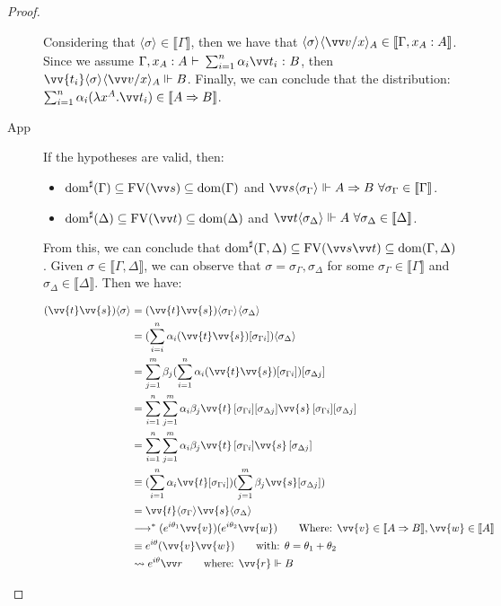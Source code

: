 \documentclass[runningheads,orivec,envcountsame,envcountsect]{llncs}
\newcommand\lra{\longrightarrow}
\newcommand\ansubst[2]{\ensuremath{\langle #1 \rangle_{#2}}}
\newcommand\dom[1]{\mathrm{dom}(#1)}
\newcommand\sdom[1]{\mathrm{dom}^{\sharp}(#1)}
\newcommand\FV[1]{\mathrm{FV}(#1)}
\def\Lam#1#2#3{\lambda#1^{#2}{.}#3} %
\def\lraneq{\rightsquigarrow}
\def\eval{\lra^*}
\def\Arr{\Rightarrow}
\def\sem#1{\llbracket#1\rrbracket}
\def\TYP#1#2#3{#1~{\vdash}~#2~{:}~#3}
\def\real{\Vdash}
\begin{document}
\begin{proof}
\begin{description}
    Considering that $\ansubst{\sigma}{}\in\sem{\Gamma}$, then we have that $\ansubst{\sigma}{}\ansubst{\vv v/x}{A}\in\sem{\Gamma,x_A:A}$. Since we assume $\TYP{\Gamma, x_A:A}{\sum_{i=1}^{n}\alpha_i\vv t_i}{B}$, then $\vv{t_i}\ansubst{\sigma}{}\ansubst{\vv v/x}{A}\real B$. Finally, we can conclude that the distribution: $\sum_{i=1}^{n}\alpha_i (\Lam{x}{A}{\vv t_i})\in\sem{A\Arr B}$.

    \item[App] If the hypotheses are valid, then:
    \begin{itemize}
        \item $\sdom{\Gamma}\subseteq \FV{\vv s}\subseteq \dom{\Gamma}$ and $\vv s \ansubst{\sigma_\Gamma}{}\Vdash A\Arr B\ \forall \sigma_\Gamma\in\sem{\Gamma}$.
        \item $\sdom{\Delta}\subseteq \FV{\vv t}\subseteq \dom{\Delta}$ and $\vv t\ansubst{\sigma_\Delta}{}\Vdash A\ \forall\sigma_\Delta\in\sem{\Delta}$.
    \end{itemize}
    
    From this, we can conclude that $\sdom{\Gamma,\Delta}\subseteq \FV{\vv s \vv t}\subseteq \dom{\Gamma,\Delta}$. Given $\sigma\in\sem{\Gamma,\Delta}$, we can observe that $\sigma=\sigma_\Gamma,\sigma_\Delta$ for some $\sigma_\Gamma\in\sem{\Gamma}$ and $\sigma_\Delta\in\sem{\Delta}$. Then we have:
    
    \begin{align*}
        (\vv{t}\vv{s})\ansubst{\sigma}{} &= (\vv{t}\vv{s})\ansubst{\sigma_\Gamma}{}\ansubst{\sigma_\Delta}{}\\
        &=(\sum_{i=i}^{n}\alpha_i (\vv{t}\vv{s})[\sigma_{\Gamma i}])\ansubst{\sigma_\Delta}{}\\
        &=\sum_{j=1}^{m} \beta_j (\sum_{i=1}^{n} \alpha_i (\vv{t} \vv{s})[\sigma_{\Gamma i}])[\sigma_{\Delta j}]\\
        &=\sum_{i=1}^{n}\sum_{j=1}^{m} \alpha_i \beta_j \vv{t}\,[\sigma_{\Gamma i}][\sigma_{\Delta j}] \vv{s}\,[\sigma_{\Gamma i}][\sigma_{\Delta j}]\\
        &=\sum_{i=1}^{n}\sum_{j=1}^{m} \alpha_i \beta_j \vv{t}\,[\sigma_{\Gamma i}]\vv{s}\,[\sigma_{\Delta j}]\\
        &\equiv (\sum_{i=1}^{n}\alpha_i\vv{t}[\sigma_{\Gamma i}])(\sum_{j=1}^{m} \beta_j \vv{s}[\sigma_{\Delta j}])\\
        &=\vv{t}\ansubst{\sigma_\Gamma}{} \vv{s}\ansubst{\sigma_\Delta}{}\\
        &\eval (e^{i\theta_{1}} \vv{v}) (e^{i\theta_{2}} \vv{w})\qquad\text{Where: } \vv{v}\in\sem{A\Arr B}, \vv{w}\in\sem{A}\\
        &\equiv e^{i\theta} (\vv{v} \vv{w})\qquad\text{with: }\theta=\theta_1 + \theta_2\\
        &\lraneq e^{i\theta}\vv r\qquad\text{where: } \vv{r}\real B
    \end{align*}
    

\end{description}
\end{proof}
\end{document}
